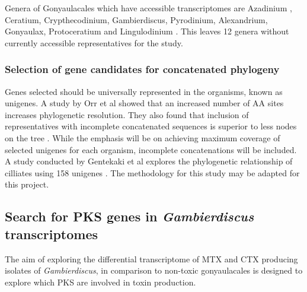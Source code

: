 \documentclass[12pt]{article}
\begin{document}
Genera of Gonyaulacales which have accessible transcriptomes are Azadinium \cite{murray2012genetic}, Ceratium, Crypthecodinium, Gambierdiscus, Pyrodinium, Alexandrium, Gonyaulax, Protoceratium and Lingulodinium \cite{kohli2015polyketide}.
This leaves 12 genera without currently accessible representatives for the study.

\subsubsection{Selection of gene candidates for concatenated phylogeny}
Genes selected should be universally represented in the organisms, known as unigenes. A study by Orr et al showed that an increased number of AA sites increases phylogenetic resolution. They also found that inclusion of representatives with incomplete concatenated sequences is superior to less nodes on the tree \cite{orr2012naked}.
While the emphasis will be on achieving maximum coverage of selected unigenes for each organism, incomplete concatenations will be included. A study conducted by Gentekaki et al explores the phylogenetic relationship of cilliates using 158 unigenes \cite{gentekaki2014large}.
The methodology for this study may be adapted for this project.



\subsection{Search for PKS genes in \emph{Gambierdiscus} transcriptomes}
The aim of exploring the differential transcriptome of MTX and CTX producing isolates of \emph{Gambierdiscus}, in comparison to non-toxic gonyaulacales is designed to explore which PKS are involved in toxin production. \\
\end{document}
